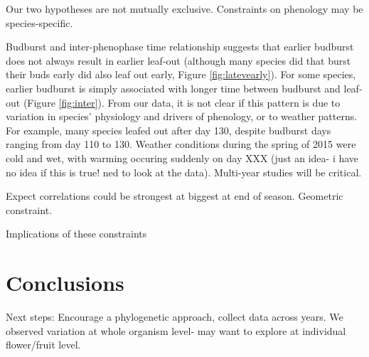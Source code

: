 \documentclass{article}
\begin{document}
\par Our two hypotheses are not mutually exclusive. Constraints on phenology may be species-specific. 
\par Budburst and inter-phenophase time relationship suggests that earlier budburst does not always result in earlier leaf-out (although many species did that burst their buds early did also leaf out early, Figure \ref{fig:latevearly}). For some species, earlier budburst is simply associated with longer time between budburst and leaf-out (Figure \ref{fig:inter}). From our data, it is not clear if this pattern is due to variation in species' physiology and drivers of phenology, or to weather patterns. For example, many species leafed out after day 130, despite budburst days ranging from day 110 to 130. Weather conditions during the spring of 2015 were cold and wet, with warming occuring suddenly on day XXX (just an idea- i have no idea if this is true! ned to look at the data). Multi-year studies will be critical. 
\par Expect correlations could be strongest  at biggest at end of season. Geometric constraint.
\par Implications of these constraints
\section* {Conclusions}
Next steps: Encourage a phylogenetic approach, collect data across years. We observed variation at whole organism level- may want to explore at individual flower/fruit level. 
\end{document}
